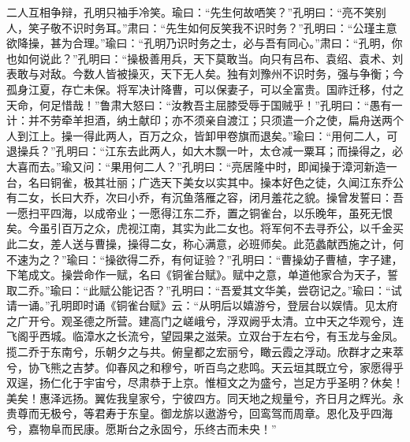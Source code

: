 二人互相争辩，孔明只袖手冷笑。瑜曰：“先生何故哂笑？”孔明曰：“亮不笑别人，笑子敬不识时务耳。”肃曰：“先生如何反笑我不识时务？”孔明曰：“公瑾主意欲降操，甚为合理。”瑜曰：“孔明乃识时务之士，必与吾有同心。”肃曰：“孔明，你也如何说此？”孔明曰：“操极善用兵，天下莫敢当。向只有吕布、袁绍、袁术、刘表敢与对敌。今数人皆被操灭，天下无人矣。独有刘豫州不识时务，强与争衡；今孤身江夏，存亡未保。将军决计降曹，可以保妻子，可以全富贵。国祚迁移，付之天命，何足惜哉！”鲁肃大怒曰：“汝教吾主屈膝受辱于国贼乎！”孔明曰：“愚有一计：并不劳牵羊担酒，纳土献印；亦不须亲自渡江；只须遣一介之使，扁舟送两个人到江上。操一得此两人，百万之众，皆卸甲卷旗而退矣。”瑜曰：“用何二人，可退操兵？”孔明曰：“江东去此两人，如大木飘一叶，太仓减一粟耳；而操得之，必大喜而去。”瑜又问：“果用何二人？”孔明曰：“亮居隆中时，即闻操于漳河新造一台，名曰铜雀，极其壮丽；广选天下美女以实其中。操本好色之徒，久闻江东乔公有二女，长曰大乔，次曰小乔，有沉鱼落雁之容，闭月羞花之貌。操曾发誓曰：吾一愿扫平四海，以成帝业；一愿得江东二乔，置之铜雀台，以乐晚年，虽死无恨矣。今虽引百万之众，虎视江南，其实为此二女也。将军何不去寻乔公，以千金买此二女，差人送与曹操，操得二女，称心满意，必班师矣。此范蠡献西施之计，何不速为之？”瑜曰：“操欲得二乔，有何证验？”孔明曰：“曹操幼子曹植，字子建，下笔成文。操尝命作一赋，名曰《铜雀台赋》。赋中之意，单道他家合为天子，誓取二乔。”瑜曰：“此赋公能记否？”孔明曰：“吾爱其文华美，尝窃记之。”瑜曰：“试请一诵。”孔明即时诵《铜雀台赋》云：“从明后以嬉游兮，登层台以娱情。见太府之广开兮。观圣德之所营。建高门之嵯峨兮，浮双阙乎太清。立中天之华观兮，连飞阁乎西城。临漳水之长流兮，望园果之滋荣。立双台于左右兮，有玉龙与金凤。揽二乔于东南兮，乐朝夕之与共。俯皇都之宏丽兮，瞰云霞之浮动。欣群才之来萃兮，协飞熊之吉梦。仰春风之和穆兮，听百鸟之悲鸣。天云垣其既立兮，家愿得乎双逞，扬仁化于宇宙兮，尽肃恭于上京。惟桓文之为盛兮，岂足方乎圣明？休矣！美矣！惠泽远扬。翼佐我皇家兮，宁彼四方。同天地之规量兮，齐日月之辉光。永贵尊而无极兮，等君寿于东皇。御龙旂以遨游兮，回鸾驾而周章。恩化及乎四海兮，嘉物阜而民康。愿斯台之永固兮，乐终古而未央！”

